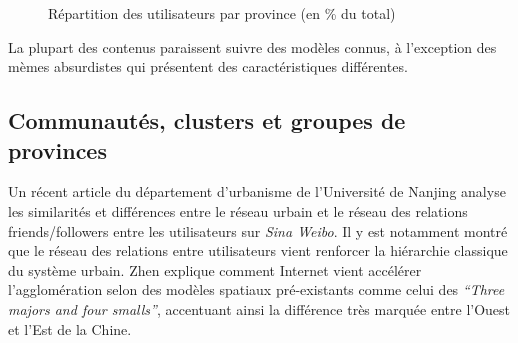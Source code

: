 \begin{figure}[htbp]
    \centering
    \caption{
        Répartition des utilisateurs par province (en \% du total)
    }

\end{figure}

La plupart des contenus paraissent suivre des modèles connus, à l'exception des mèmes absurdistes qui présentent des caractéristiques différentes.

\subsection{Communautés, clusters et groupes de provinces}

Un récent article du département d{\textquoteright}urbanisme de l{\textquoteright}Université de Nanjing \citep{Zhen2013} analyse les similarités et différences entre le réseau urbain et le réseau des relations friends/followers entre les utilisateurs sur \textit{Sina Weibo}. Il y est notamment montré que le réseau des relations entre utilisateurs vient renforcer la hiérarchie classique du système urbain. Zhen explique comment Internet vient accélérer l{\textquoteright}agglomération selon des modèles spatiaux pré-existants comme celui des \textit{``Three majors and four smalls''}, accentuant ainsi la différence très marquée entre l{\textquoteright}Ouest et l{\textquoteright}Est de la Chine.

